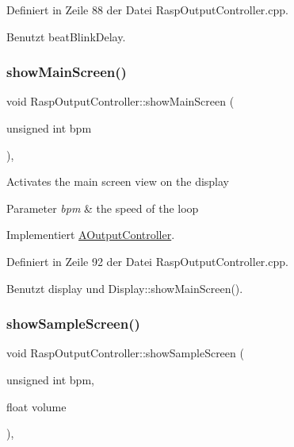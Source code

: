 Definiert in Zeile 88 der Datei Rasp\+Output\+Controller.\+cpp.



Benutzt beat\+Blink\+Delay.

\mbox{\label{class_rasp_output_controller_ad195a3d664b7c7e5680cd8949203c1fc}} 
\subsubsection{\texorpdfstring{show\+Main\+Screen()}{showMainScreen()}}
{\footnotesize\ttfamily void Rasp\+Output\+Controller\+::show\+Main\+Screen (\begin{DoxyParamCaption}\item[{unsigned int}]{bpm }\end{DoxyParamCaption})\hspace{0.3cm}{\ttfamily [override]}, {\ttfamily [virtual]}}

Activates the main screen view on the display 
\begin{DoxyParams}{Parameter}
{\em bpm} & the speed of the loop \\
\hline
\end{DoxyParams}


Implementiert \hyperlink{class_a_output_controller_ace7df9de71110b3615156b9bd06a9349}{A\+Output\+Controller}.



Definiert in Zeile 92 der Datei Rasp\+Output\+Controller.\+cpp.



Benutzt display und Display\+::show\+Main\+Screen().

\mbox{\label{class_rasp_output_controller_a613d3a1d1ceb31875be95e4a4b733fba}} 
\subsubsection{\texorpdfstring{show\+Sample\+Screen()}{showSampleScreen()}}
{\footnotesize\ttfamily void Rasp\+Output\+Controller\+::show\+Sample\+Screen (\begin{DoxyParamCaption}\item[{unsigned int}]{bpm,  }\item[{float}]{volume }\end{DoxyParamCaption})\hspace{0.3cm}{\ttfamily [override]}, {\ttfamily [virtual]}}

